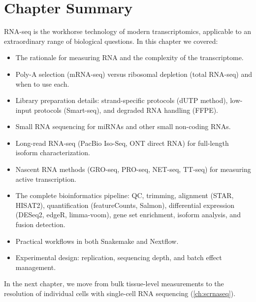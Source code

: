 \section{Chapter Summary}
\label{sec:rnaseq:summary}

RNA-seq is the workhorse technology of modern transcriptomics, applicable to
an extraordinary range of biological questions. In this chapter we covered:

\begin{itemize}[nosep]
  \item The rationale for measuring RNA and the complexity of the transcriptome.
  \item Poly-A selection (mRNA-seq) versus ribosomal depletion (total RNA-seq)
    and when to use each.
  \item Library preparation details: strand-specific protocols (dUTP method),
    low-input protocols (Smart-seq), and degraded RNA handling (FFPE).
  \item Small RNA sequencing for miRNAs and other small non-coding RNAs.
  \item Long-read RNA-seq (PacBio Iso-Seq, ONT direct RNA) for full-length
    isoform characterization.
  \item Nascent RNA methods (GRO-seq, PRO-seq, NET-seq, TT-seq) for measuring
    active transcription.
  \item The complete bioinformatics pipeline: QC, trimming, alignment (STAR,
    HISAT2), quantification (featureCounts, Salmon), differential expression
    (DESeq2, edgeR, limma-voom), gene set enrichment, isoform analysis, and
    fusion detection.
  \item Practical workflows in both Snakemake and Nextflow.
  \item Experimental design: replication, sequencing depth, and batch effect
    management.
\end{itemize}

In the next chapter, we move from bulk tissue-level measurements to the
resolution of individual cells with single-cell RNA sequencing
(\cref{ch:scrnaseq}).
